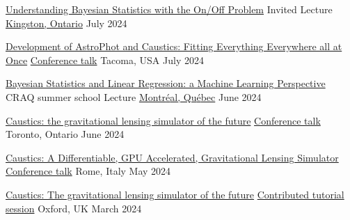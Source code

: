 \begin{cvhonors}
  \cvhonor
    {\href{https://colab.research.google.com/drive/13LGl-VUUt1RONh2PTSRPLGulocpXGCdU?usp=sharing}{Understanding Bayesian Statistics with the On/Off Problem}} %
    {Invited Lecture} %
    {\href{https://www.queensu.ca/}{Kingston, Ontario}} %
    {July 2024} %
    
  \cvhonor
    {\href{https://docs.google.com/presentation/d/1bRg4IIQe3geO0_ADuluHg8fKzAvxqx1P_JYmR6kNtPw/edit?usp=sharing}{Development of AstroPhot and Caustics: Fitting Everything Everywhere all at Once}} %
    {\href{https://www.scipy2024.scipy.org/}{Conference talk}} %
    {Tacoma, USA} %
    {July 2024} %

  \cvhonor
    {\href{https://colab.research.google.com/drive/1EYraAvpAKUirenM8FO1O0MmDEpI9tlkb?usp=sharing}{Bayesian Statistics and Linear Regression: a Machine Learning Perspective}} %
    {CRAQ summer school Lecture} %
    {\href{https://craq-astro.ca/?lang=en}{Montr{\'e}al, Qu{\'e}bec}} %
    {June 2024} %

  \cvhonor
    {\href{https://cascato.ca/}{Caustics: the gravitational lensing simulator of the future}} %
    {\href{https://casca.ca/}{Conference talk}} %
    {Toronto, Ontario} %
    {June 2024} %

  \cvhonor
    {\href{https://docs.google.com/presentation/d/1omhmFVWt6E6HhErikKKnGt-MGxY4v25e0nsp740eq4M/edit?usp=sharing}{Caustics: A Differentiable, GPU Accelerated, Gravitational Lensing Simulator}} %
    {\href{https://eurasiaconferences.com/events/rome/2024/artificial-intelligence-machine-learning-and-data-science/}{Conference talk}} %
    {Rome, Italy} %
    {May 2024} %

  \cvhonor
    {\href{https://sites.google.com/view/rubinslens24/programme?authuser=0}{Caustics: The gravitational lensing simulator of the future}} %
    {\href{https://sites.google.com/view/rubinslens24/}{Contributed tutorial session}} %
    {Oxford, UK} %
    {March 2024} %


\end{cvhonors}
